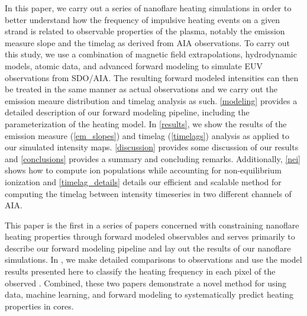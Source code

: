 In this paper, we carry out a series of nanoflare heating simulations in order to better understand how the frequency of impulsive heating events on a given strand is related to observable properties of the plasma, notably the emission measure slope and the timelag as derived from AIA observations. To carry out this study, we use a combination of magnetic field extrapolations, hydrodynamic models, atomic data, and advanced forward modeling to simulate EUV observations from SDO/AIA. The resulting forward modeled intensities can then be treated in the same manner as actual observations and we carry out the emission meaure distribution and timelag analysis as such. \autoref{modeling} provides a detailed description of our forward modeling pipeline, including the parameterization of the heating model. In \autoref{results}, we show the results of the emission measure (\autoref{em_slopes}) and timelag (\autoref{timelags}) analysis as applied to our simulated intensity maps. \autoref{discussion} provides some discussion of our results and \autoref{conclusions} provides a summary and concluding remarks. Additionally, \autoref{nei} shows how to compute ion populations while accounting for non-equilibrium ionization and \autoref{timelag_details} details our efficient and scalable method for computing the timelag between intensity timeseries in two different channels of AIA.

This paper is the first in a series of papers concerned with constraining nanoflare heating properties through forward modeled observables and serves primarily to describe our forward modeling pipeline and lay out the results of our nanoflare simulations. In \citet[ hereafter]{barnes_understanding_2018-1}, we make detailed comparisons to observations and use the model results presented here to classify the heating frequency in each pixel of the observed \AR{}. Combined, these two papers demonstrate a novel method for using data, machine learning, and forward modeling to systematically predict heating properties in \AR{} cores.
